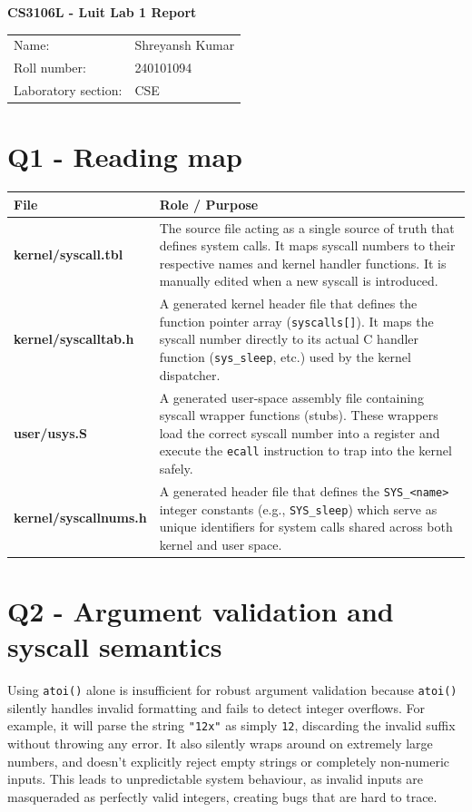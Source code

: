 \documentclass[11pt,a4paper]{article}
\begin{document}
\begin{center}
{\Large\bfseries CS3106L - Luit Lab 1 Report}\\[3mm]
\begin{tabularx}{0.9\textwidth}{@{}lX@{}}
Name: & Shreyansh Kumar \\
Roll number: & 240101094 \\
Laboratory section: & CSE \\
\end{tabularx}
\end{center}

\section*{Q1 - Reading map}
\begin{tabularx}{\textwidth}{|l|X|}
\hline
\textbf{File} & \textbf{Role / Purpose} \\ \hline
\textbf{kernel/syscall.tbl} & The source file acting as a single source of truth that defines system calls. It maps syscall numbers to their respective names and kernel handler functions. It is manually edited when a new syscall is introduced. \\ \hline
\textbf{kernel/syscalltab.h} & A generated kernel header file that defines the function pointer array (\texttt{syscalls[]}). It maps the syscall number directly to its actual C handler function (\texttt{sys\_sleep}, etc.) used by the kernel dispatcher. \\ \hline
\textbf{user/usys.S} & A generated user-space assembly file containing syscall wrapper functions (stubs). These wrappers load the correct syscall number into a register and execute the \texttt{ecall} instruction to trap into the kernel safely. \\ \hline
\textbf{kernel/syscallnums.h} & A generated header file that defines the \texttt{SYS\_<name>} integer constants (e.g., \texttt{SYS\_sleep}) which serve as unique identifiers for system calls shared across both kernel and user space. \\ \hline
\end{tabularx}

\section*{Q2 - Argument validation and syscall semantics}

Using \texttt{atoi()} alone is insufficient for robust argument validation because \texttt{atoi()} silently handles invalid formatting and fails to detect integer overflows. For example, it will parse the string \texttt{"12x"} as simply \texttt{12}, discarding the invalid suffix without throwing any error. It also silently wraps around on extremely large numbers, and doesn't explicitly reject empty strings or completely non-numeric inputs. This leads to unpredictable system behaviour, as invalid inputs are masqueraded as perfectly valid integers, creating bugs that are hard to trace.
\end{document}
